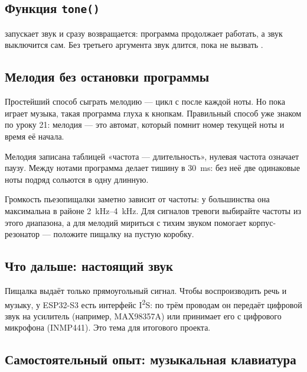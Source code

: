 \subsection{Функция \texttt{tone()}}

 запускает звук и сразу возвращается: программа продолжает
работать, а звук выключится сам. Без третьего аргумента звук длится, пока не вызвать .


\subsection{Мелодия без остановки программы}

Простейший способ сыграть мелодию --- цикл с  после каждой ноты. Но пока играет музыка,
такая программа глуха к кнопкам. Правильный способ уже знаком по уроку 21: мелодия --- это автомат,
который помнит номер текущей ноты и время её начала.


Мелодия записана таблицей «частота --- длительность», нулевая частота означает паузу. Между нотами
программа делает тишину в \SI{30}{ms}: без неё две одинаковые ноты подряд сольются в одну длинную.

\begin{tip}
Громкость пьезопищалки заметно зависит от частоты: у большинства она максимальна в районе
\SIrange{2}{4}{kHz}. Для сигналов тревоги выбирайте частоты из этого диапазона, а для мелодий мириться
с тихим звуком помогает корпус-резонатор --- положите пищалку на пустую коробку.
\end{tip}

\subsection{Что дальше: настоящий звук}

Пищалка выдаёт только прямоугольный сигнал. Чтобы воспроизводить речь и музыку, у ESP32-S3 есть
интерфейс I\textsuperscript{2}S: по трём проводам он передаёт цифровой звук на усилитель (например,
MAX98357A) или принимает его с цифрового микрофона (INMP441). Это тема для итогового проекта.

\subsection{Самостоятельный опыт: музыкальная клавиатура}

